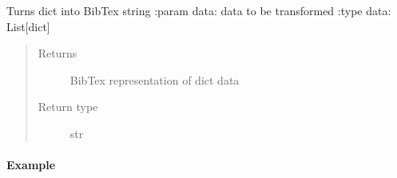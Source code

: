\documentclass[letterpaper,10pt,english]{sphinxmanual}
\begin{document}

\begin{fulllineitems}
\label{modules/pybibtools:listb.pybibtools.bibtex_dump}
Turns dict into BibTex string
:param data: data to be transformed
:type data: List{[}dict{]}
\begin{quote}\begin{description}
\item[{Returns}] \leavevmode
BibTex representation of dict data

\item[{Return type}] \leavevmode
str

\end{description}\end{quote}
\paragraph{Example}


\end{fulllineitems}
\end{document}
